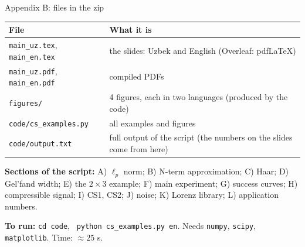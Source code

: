 \documentclass[aspectratio=169,11pt]{beamer}
\begin{document}
\begin{frame}{Appendix B: files in the zip}
  \centering\small
  \begin{tabular}{@{}lp{8.2cm}@{}}
    \toprule
    File & What it is \\
    \midrule
    \texttt{main\_uz.tex}, \texttt{main\_en.tex} & the slides: Uzbek and English (Overleaf: pdfLaTeX) \\
    \texttt{main\_uz.pdf}, \texttt{main\_en.pdf} & compiled PDFs \\
    \texttt{figures/} & 4 figures, each in two languages (produced by the code) \\
    \texttt{code/cs\_examples.py} & all examples and figures \\
    \texttt{code/output.txt} & full output of the script (the numbers on the slides come from here) \\
    \bottomrule
  \end{tabular}
  \medskip

  \raggedright
  \textbf{Sections of the script:} A) $\ell_p$ norm; B) N-term approximation; C) Haar; D) Gel'fand width; E) the $2\times3$ example;
  F) main experiment; G) success curves; H) compressible signal; I) CS1, CS2; J) noise; K) Lorenz library; L) application numbers.
  \medskip

  \textbf{To run:} \texttt{cd code}, \ \texttt{python cs\_examples.py en}. Needs \texttt{numpy}, \texttt{scipy}, \texttt{matplotlib}. Time: $\approx25$ s.
\end{frame}
\end{document}
